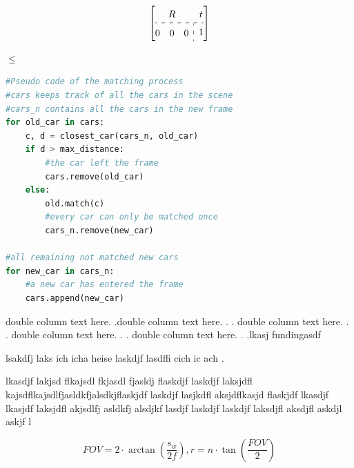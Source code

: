 \documentclass[conference]{IEEEtran}
\begin{document}
\[
    \renewcommand{\arraystretch}{1.5}
    \left[\begin{array}{@{}c:c@{}}
            R                        & t \\ \hdashline
            \begin{array}{@{}ccc@{}}
                0 & 0 & 0
            \end{array} & 1
        \end{array}\right]
\]

$\leq$

\begin{lstlisting}[language=Python, basicstyle=\small, tabsize=4]
#Pseudo code of the matching process
#cars keeps track of all the cars in the scene
#cars_n contains all the cars in the new frame
for old_car in cars:
    c, d = closest_car(cars_n, old_car)
	if d > max_distance:
        #the car left the frame
	    cars.remove(old_car)
	else:
        old.match(c)
        #every car can only be matched once
        cars_n.remove(new_car)

#all remaining not matched new cars
for new_car in cars_n: 
    #a new car has entered the frame 
    cars.append(new_car) 
\end{lstlisting}


\begin{multicols}{2}

    double column text here. .double column text here. . .
    double column text here. . .
    double column text here. . .
    double column text here. . .lkasj fundingasdf

    lsakdfj laks ich icha heise laskdjf lasdffi cich ic ach
    .

\end{multicols}
lkasdjf lakjsd flkajsdl fkjasdl fjasldj flaskdjf laskdjf laksjdfl kajsdflkajsdlfjasldkfjalsdkjflaskjdf laskdjf lasjkdfl aksjdflkasjd flaskjdf lkasdjf lkasjdf laksjdfl akjsdlfj asldkfj alsdjkf lasdjf laskdjf laskdjf laksdjfl aksdjfl askdjl askjf l

\begin{equation}
    FOV = 2 \cdot \arctan\left(\frac{s_w}{2f}\right),
    r = n \cdot \tan\left(\frac{FOV}{2}\right)
\end{equation}
\end{document}
